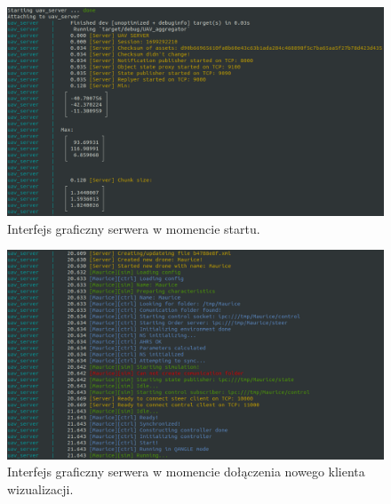 \documentclass[15pt]{sprawozdanie}
\begin{document}
\newpage
\begin{figure}[!h]
	\centering
	\includegraphics[width=1\textwidth]{gui_server_start.png}
	\caption{Interfejs graficzny serwera w momencie startu.}
	\label{gui_server1}
\end{figure}

\begin{figure}[!h]
	\centering
	\includegraphics[width=1\textwidth]{gui_server_drone.png}
	\caption{Interfejs graficzny serwera w momencie dołączenia nowego klienta wizualizacji.}
	\label{gui_server2}
\end{figure}
\end{document}
